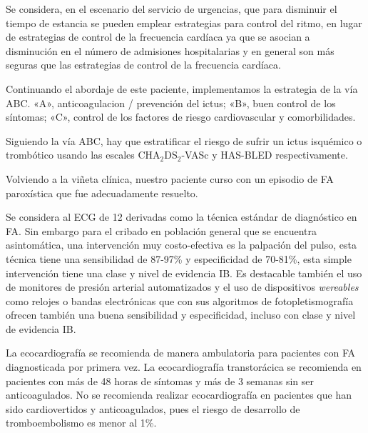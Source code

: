 \documentclass[a4paper]{article}
\let\cite=\supercite
\begin{document}
\begin{multicols}{3}
Se considera, en el escenario del servicio de urgencias, que para disminuir
el tiempo de estancia se pueden emplear estrategias para control del ritmo,
en lugar de estrategias de control de la frecuencia cardíaca ya que se asocian
a disminución en el número de admisiones hospitalarias y en general son más
seguras que las estrategias de control de la frecuencia cardíaca.

Continuando el abordaje de este paciente, implementamos la estrategia de la vía ABC\cite{lip_abc_2017}. «A», anticoagulacion / prevención del ictus; «B», buen control de los síntomas; «C», control de los factores de riesgo cardiovascular y comorbilidades.

Siguiendo la vía ABC, hay que estratificar el riesgo de sufrir un ictus
isquémico o trombótico usando las escales CHA$_{\text{2}}$DS$_{\text{2}}$-VASc
y HAS-BLED respectivamente.

Volviendo a la viñeta clínica, nuestro paciente curso con un episodio de FA
paroxística que fue adecuadamente resuelto.

Se considera al ECG de 12 derivadas como la técnica estándar de diagnóstico en
FA\cite{mairesse2017}. Sin embargo para el cribado en población general que
se encuentra asintomática, una intervención muy costo-efectiva es la palpación
del pulso, esta técnica tiene una sensibilidad de 87-97\% y especificidad de
70-81\%, esta simple intervención tiene una clase y nivel de evidencia IB. Es
destacable también el uso de monitores de presión arterial automatizados y el
uso de dispositivos \emph{wereables} como relojes o bandas electrónicas que
con sus algoritmos de fotopletismografía ofrecen también una buena
sensibilidad y especificidad, incluso con clase y nivel de evidencia
IB\cite{guiaesc_2021}.

La ecocardiografía se recomienda de manera ambulatoria para pacientes con FA
diagnosticada por primera vez. La ecocardiografía transtorácica se recomienda
en pacientes con más de 48 horas de síntomas y más de 3 semanas sin ser
anticoagulados\cite{ecoamb19}. No se recomienda realizar ecocardiografía en
pacientes que han sido cardiovertidos y anticoagulados, pues el riesgo de
desarrollo de tromboembolismo es menor al 1\%\cite{eco13}.

\end{multicols}

\closearticle

\begin{multicols}{3}

\printbibliography[heading=none]

\end{multicols}
\end{document}
